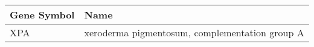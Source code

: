 \begin{tabular}{ll}
\toprule
Gene Symbol &                                           Name \\
\midrule
        XPA & xeroderma pigmentosum, complementation group A \\
\bottomrule
\end{tabular}
